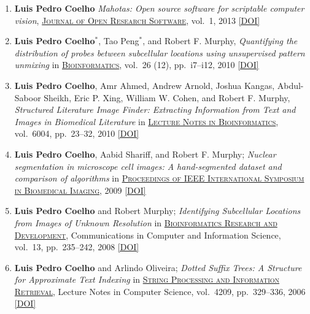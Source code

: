 \documentclass{article}
\newcommand\showdoi[1]{%
    \href{http://dx.doi.org/#1}{[DOI]}%
}
\newcommand\pubname[1]{\textsc{\uline{#1}}}
\newcommand\contribution[1]{\relax}
\newcommand\costar{${}^{*}$}
\begin{document}
\begin{enumerate}[resume]
\item \textbf{Luis Pedro Coelho} \emph{Mahotas: Open source software for
scriptable computer vision}, \pubname{Journal of Open Research Software}, vol.\
1, 2013 \showdoi{10.5334/jors.ac}
\contribution{I implemented the underlying computer vision software and the manuscript.}

\item \textbf{Luis Pedro Coelho}\costar, Tao Peng\costar, and Robert F.
Murphy, \emph{Quantifying the distribution of probes between subcellular
locations using unsupervised pattern unmixing} in \pubname{Bioinformatics},
vol.\ 26 (12), pp.\ i7--i12, 2010 \showdoi{10.1093/bioinformatics/btq220}
\contribution{I conceived of and implemented one of the methods presented and
wrote the manuscript.}

\item \textbf{Luis Pedro Coelho}, Amr Ahmed, Andrew Arnold, Joshua Kangas,
Abdul-Saboor Sheikh, Eric P. Xing, William W. Cohen, and Robert F. Murphy,
\emph{Structured Literature Image Finder: Extracting Information from Text and
Images in Biomedical Literature} in \pubname{Lecture Notes in Bioinformatics},
vol.\ 6004, pp.\ 23--32, 2010 \showdoi{10.1007/978-3-642-13131-8_4}
\contribution{With the paper below, this forms a package on the SLIF project,
where I enhanced the image analysis pipeline (for the analysis of figures in
published scientific literature). I wrote the first draft of this manuscript
and helped draft the one below.}

\item \textbf{Luis Pedro Coelho}, Aabid Shariff, and Robert F. Murphy;
\emph{Nuclear segmentation in microscope cell images: A hand-segmented dataset
and comparison of algorithms} in \pubname{Proceedings of IEEE International
Symposium in Biomedical Imaging}, 2009 \showdoi{10.1109/ISBI.2009.5193098}
\contribution{I acquired (part of) the microscopy data, built the
hand-segmented dataset, implemented the methods and wrote the first draft of
the manuscript.}

\item \textbf{Luis Pedro Coelho} and Robert Murphy; \emph{Identifying
Subcellular Locations from Images of Unknown Resolution} in
\pubname{Bioinformatics Research and Development}, Communications in Computer
and Information Science, vol.\ 13, pp.\ 235--242, 2008
\showdoi{10.1007/978-3-540-70600-7_18}
\contribution{I implemented the algorithm, ran the tests, and wrote the first
draft of the paper.}

\item \textbf{Luis Pedro Coelho} and Arlindo Oliveira; \emph{Dotted Suffix
Trees: A Structure for Approximate Text Indexing} in \pubname{String Processing
and Information Retrieval}, Lecture Notes in Computer Science, vol.\ 4209, pp.\
329--336, 2006 \showdoi{10.1007/11880561_27}
\contribution{I developed and implemented the algorithm and wrote the first
draft of the manuscript.}

\end{enumerate}
\end{document}

